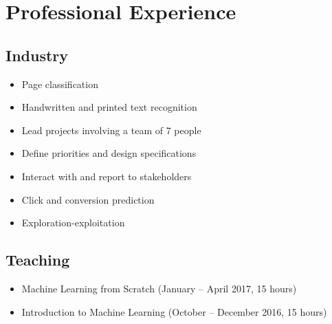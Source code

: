 \documentclass[11pt,a4paper,sans]{moderncv}   %
\begin{document}
\makecvtitle

\section{Professional Experience}

\subsection{Industry}

{
\begin{itemize}
	\item Page classification
	\item Handwritten and printed text recognition
\end{itemize}
}

{
\begin{itemize}
	\item Lead projects involving a team of 7 people
	\item Define priorities and design specifications
	\item Interact with and report to stakeholders
\end{itemize}
}
\vspace*{-1em}
{
\begin{itemize}
	\item Click and conversion prediction
	\item Exploration-exploitation
\end{itemize}
}

\subsection{Teaching}

{
\begin{itemize}
	\item Machine Learning from Scratch (January -- April 2017, 15 hours)
	\item Introduction to Machine Learning (October -- December 2016, 15 hours)
\end{itemize}
}
\end{document}
